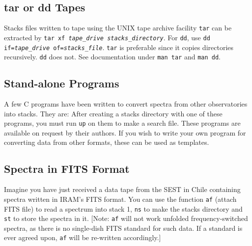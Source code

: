 \subsection{{\twelvett tar} or {\twelvett dd} Tapes}

Stacks files written to tape using the UNIX tape archive
facility {\tt tar} can be extracted by 
{\tt tar xf {\it tape\_drive stacks\_directory}}.
For {\tt dd}, use {\tt dd if={\it tape\_drive} of={\it stacks\_file}}. 
{\tt tar} is preferable since it copies directories recursively. {\tt dd}
does not.  See documentation under {\tt man tar} and {\tt man dd}.

\subsection{Stand-alone Programs}
\label{sec-stand}

A few C programs have been written to convert spectra
from other observatories into \COMB stacks.
They are:
\smallskip
{} 
\smallskip\noindent
After creating a stacks directory with one of these programs, you 
must run {\tt up} on them to make a search file. These programs are
available on request by their authors. If you wish to write your own program 
for converting data from other formats, these can be used as templates.

\subsection{Spectra in FITS Format}

Imagine you have just received a data tape from the SEST in Chile
containing spectra written in IRAM's FITS format.  
You can use the function {\tt af} (attach FITS file) to read a spectrum into 
stack 1, {\tt ns} to make 
the stacks directory and {\tt st} to store the spectra in it.
[Note: {\tt af} will not work unfolded frequency-switched spectra, as there
is no single-dish FITS standard for such data. If a standard is ever
agreed upon, {\tt af} will be re-written accordingly.]

